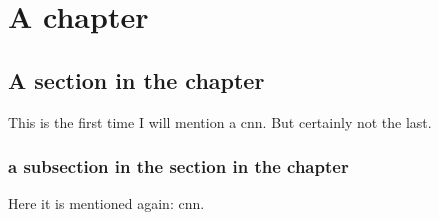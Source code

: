 \chapter{A chapter}
\section{A section in the chapter}
This is the first time I will mention a \gls{cnn}. But certainly not the last.
\subsection{a subsection in the section in the chapter}
Here it is mentioned again: \gls{cnn}\cite{he2015deep}.